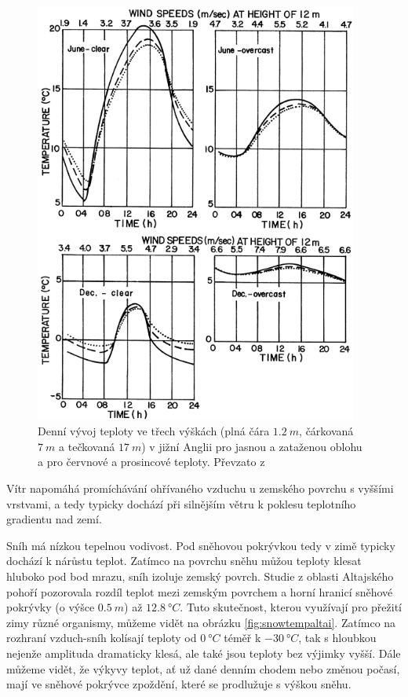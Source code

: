\begin{figure}
	\centering
	\includegraphics[width=0.95\textwidth]{img/ch1/diurnaltemp.png}
	\caption{Denní vývoj teploty ve třech výškách (plná čára $\SI{1.2}{m}$, čárkovaná $\SI{7}{m}$ a tečkovaná $\SI{17}{m}$) v jižní Anglii pro jasnou a zataženou oblohu a pro červnové a prosincové teploty. Převzato z \cite{arya2001}}
	\label{fig:diurnaltemp}
\end{figure}

Vítr napomáhá promíchávání ohřívaného vzduchu u zemského povrchu s vyššími vrstvami, a tedy typicky dochází při silnějším větru k poklesu teplotního gradientu nad zemí\cite{arya2001}.

Sníh má nízkou tepelnou vodivost. Pod sněhovou pokrývkou tedy v zimě typicky dochází k nárůstu teplot. Zatímco na povrchu sněhu můžou teploty klesat hluboko pod bod mrazu, sníh izoluje zemský povrch. Studie z oblasti Altajského pohoří pozorovala rozdíl teplot mezi zemským povrchem a horní hranicí sněhové pokrývky (o výšce $\SI{0.5}{m}$) až $\SI{12.8}{\degree C}$. Tuto skutečnost, kterou využívají pro přežití zimy různé organismy\cite{hirakawahirofumi2018}, můžeme vidět na obrázku \ref{fig:snowtempaltai}. Zatímco na rozhraní vzduch-sníh kolísají teploty od $\SI{0}{\degree C}$ téměř k $\SI{-30}{\degree C}$, tak s hloubkou nejenže amplituda dramaticky klesá, ale také jsou teploty bez výjimky vyšší. Dále můžeme vidět, že výkyvy teplot, ať už dané denním chodem nebo změnou počasí, mají ve sněhové pokrývce zpoždění, které se prodlužuje s výškou sněhu\cite{zhangwei2021}. 

